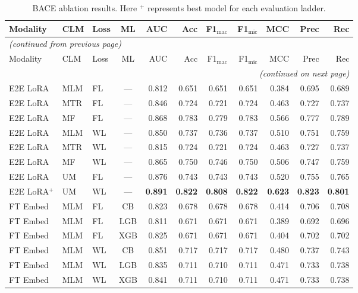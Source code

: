 \documentclass[9pt,a4paper]{article}
\begin{document}
\begin{scriptsize}
\begin{longtable}{lllcrrrrrrr}
\caption{BACE ablation results. Here $^{+}$ represents best model for each evaluation ladder.}
\label{tab:s4_bace} \\
\toprule
Modality & CLM & Loss & ML & AUC & Acc & F1$_\text{mac}$ & F1$_\text{mic}$ & MCC & Prec & Rec \\
\midrule
\endfirsthead
\multicolumn{11}{l}{\footnotesize\textit{(continued from previous page)}} \\
\toprule
Modality & CLM & Loss & ML & AUC & Acc & F1$_\text{mac}$ & F1$_\text{mic}$ & MCC & Prec & Rec \\
\midrule
\endhead
\midrule
\multicolumn{11}{r}{\footnotesize\textit{(continued on next page)}} \\
\endfoot
\bottomrule
\endlastfoot
E2E LoRA & MLM & FL & --- & 0.812 & 0.651 & 0.651 & 0.651 & 0.384 & 0.695 & 0.689 \\
E2E LoRA & MTR & FL & --- & 0.846 & 0.724 & 0.721 & 0.724 & 0.463 & 0.727 & 0.737 \\
E2E LoRA & MF  & FL & --- & 0.868 & 0.783 & 0.779 & 0.783 & 0.566 & 0.777 & 0.789 \\
E2E LoRA & MLM & WL & --- & 0.850 & 0.737 & 0.736 & 0.737 & 0.510 & 0.751 & 0.759 \\
E2E LoRA & MTR & WL & --- & 0.815 & 0.724 & 0.721 & 0.724 & 0.463 & 0.727 & 0.737 \\
E2E LoRA & MF  & WL & --- & 0.865 & 0.750 & 0.746 & 0.750 & 0.506 & 0.747 & 0.759 \\
E2E LoRA & UM  & FL & --- & 0.876 & 0.743 & 0.743 & 0.743 & 0.520 & 0.755 & 0.765 \\
E2E LoRA$^+$ & UM & WL & --- & \textbf{0.891} & \textbf{0.822} & \textbf{0.808} & \textbf{0.822} & \textbf{0.623} & \textbf{0.823} & \textbf{0.801} \\
\midrule
FT Embed & MLM & FL & CB  & 0.823 & 0.678 & 0.678 & 0.678 & 0.414 & 0.706 & 0.708 \\
FT Embed & MLM & FL & LGB & 0.811 & 0.671 & 0.671 & 0.671 & 0.389 & 0.692 & 0.696 \\
FT Embed & MLM & FL & XGB & 0.825 & 0.671 & 0.671 & 0.671 & 0.404 & 0.702 & 0.702 \\
FT Embed & MLM & WL & CB  & 0.851 & 0.717 & 0.717 & 0.717 & 0.480 & 0.737 & 0.743 \\
FT Embed & MLM & WL & LGB & 0.835 & 0.711 & 0.710 & 0.711 & 0.471 & 0.733 & 0.738 \\
FT Embed & MLM & WL & XGB & 0.841 & 0.711 & 0.710 & 0.711 & 0.471 & 0.733 & 0.738 \\

\end{longtable}
\end{scriptsize}
\end{document}
